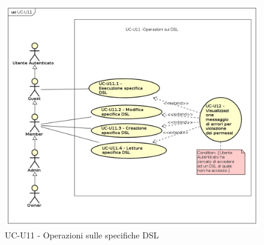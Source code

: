         \begin{figure}[H]
          \begin{center}
            \includegraphics[width=12cm]{res/img/UCUtenti/UCUtenteA/UC-U11-Operazioni DSL/UC-U11.png}
          \caption{UC-U11 - Operazioni sulle specifiche DSL}
          \end{center} 
        \end{figure}
        
